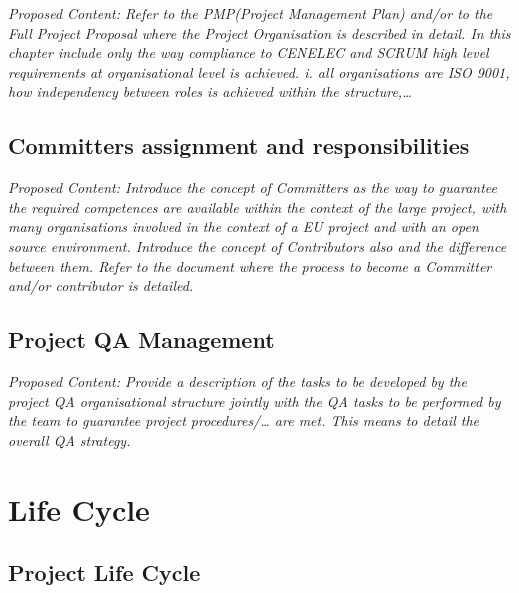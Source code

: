 \documentclass{template/openetcs_article}
\begin{document}
\textit{Proposed Content: Refer to the PMP(Project Management Plan) and/or to the Full Project Proposal where the Project Organisation is described in detail. 
In this chapter include only the way compliance to CENELEC and SCRUM high level requirements at organisational level is achieved. i. all organisations are ISO 9001, how independency between roles is achieved within the structure,{\dots}}



\subsection{Committers assignment and responsibilities}
\textit{Proposed  Content: Introduce the concept of Committers as the way to guarantee the required competences are available within the context of the large project, with many organisations involved in the context of a EU project and with an open source environment.  Introduce the concept of Contributors also and the difference between them. Refer to the document where the process to become a Committer and/or contributor is detailed.} 


\subsection{Project QA Management}
\textit{Proposed Content: Provide a description of the tasks to be developed by the project  QA organisational structure jointly with the QA tasks to be performed by the team to guarantee project procedures/{\dots} are met. This means to detail the overall QA strategy.}

\section{Life Cycle}


\subsection{Project Life Cycle }
\end{document}
